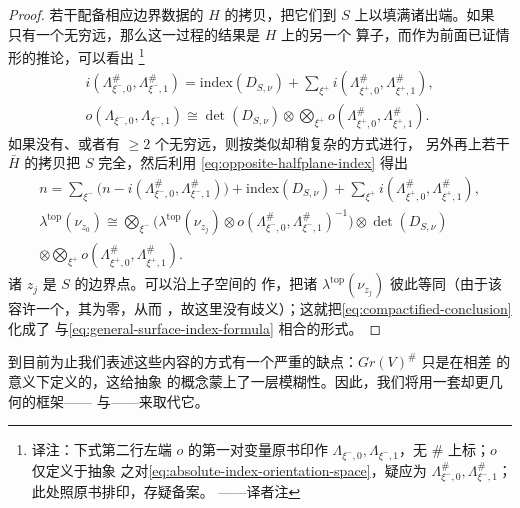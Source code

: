 \begin{proof}
若干配备相应边界数据的 $H$ 的拷贝，把它们\trGluing{}到 $S$ 上以填满诸出端。如果
只有一个无穷远\trIncomingPoint，那么这一\trGluing{}过程的结果是 $H$ 上的另一个
算子，而作为前面已证情形的推论，可以看出%
\footnote{译注：下式第二行左端 $o$ 的第一对变量原书印作
$\Lambda_{\xi^-,0},\Lambda_{\xi^-,1}$，无 $\#$ 上标；$o$ 仅定义于抽象\trLinear\trLagrange
\trBrane{}之对\eqref{eq:absolute-index-orientation-space}，疑应为
$\Lambda_{\xi^-,0}^\#,\Lambda_{\xi^-,1}^\#$；此处照原书排印，存疑备案。
——译者注}
\begin{equation*}
\begin{gathered}
i(\Lambda_{\xi^-,0}^\#,\Lambda_{\xi^-,1}^\#)=\mathrm{index}(D_{S,\nu})
+\sum_{\xi^+}i(\Lambda_{\xi^+,0}^\#,\Lambda_{\xi^+,1}^\#),\\
o(\Lambda_{\xi^-,0},\Lambda_{\xi^-,1})\cong\det(D_{S,\nu})
\otimes\bigotimes_{\xi^+}o(\Lambda_{\xi^+,0}^\#,\Lambda_{\xi^+,1}^\#).
\end{gathered}
\end{equation*}
如果没有、或者有 $\ge 2$ 个无穷远\trIncomingPoint，则按类似却稍复杂的方式进行，
另外再\trGluing{}上若干 $\bar{H}$ 的拷贝把 $S$ 完全\trCompactification，然后利用
\eqref{eq:opposite-halfplane-index} 得出
\begin{equation}\label{eq:compactified-conclusion}
\begin{gathered}
n=\sum_{\xi^-}\bigl(n-i(\Lambda_{\xi^-,0}^\#,\Lambda_{\xi^-,1}^\#)\bigr)
+\mathrm{index}(D_{S,\nu})
+\sum_{\xi^+}i(\Lambda_{\xi^+,0}^\#,\Lambda_{\xi^+,1}^\#),\\
\lambda^{\mathrm{top}}(\nu_{z_0})\cong\bigotimes_{\xi^-}
\bigl(\lambda^{\mathrm{top}}(\nu_{z_j})\otimes
o(\Lambda_{\xi^-,0}^\#,\Lambda_{\xi^-,1}^\#)^{-1}\bigr)
\otimes\det(D_{S,\nu})\\
\otimes\bigotimes_{\xi^+}o(\Lambda_{\xi^+,0}^\#,\Lambda_{\xi^+,1}^\#).
\end{gathered}
\end{equation}
诸 $z_j$ 是 $S$ 的边界点。可以沿\trCompactification\trSurface{}上\trLagrange{}子空间的%
\trLoop{}作\trParallelTransport{}，把诸 $\lambda^{\mathrm{top}}(\nu_{z_j})$ 彼此等同（由于该%
\trLoop{}容许一个\textbf{\trBraneStructure}，其\trMaslovIndex{}为零，从而%
\trOrientable，故这里没有歧义）；这就把\eqref{eq:compactified-conclusion} 化成了
与\eqref{eq:general-surface-index-formula} 相合的形式。
\end{proof}
到目前为止我们表述这些内容的方式有一个严重的缺点：$Gr(V)^\#$ 只是在相差%
\trHomotopyEquivalence{}的意义下定义的，这给抽象\trLinear\trLagrange
\trBrane{}的概念蒙上了一层模糊性。因此，我们将用一套\trEquivalence{}却更几何的框架——
\trGrading{}与\trPinStructure{}——来取代它。
